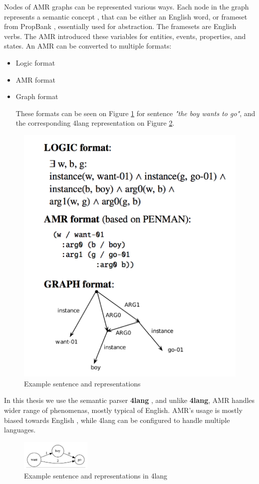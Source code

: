 Nodes of AMR graphs can be represented various ways. Each node in the graph represents a semantic concept \cite{AMR:2015}, that can be either an English word, or frameset from PropBank \cite{Palmer:2005}, essentially used for abstraction. The framesets are English verbs. The AMR introduced these variables for entities, events, properties, and states. An AMR can be converted to multiple formats:
\begin{itemize}
	\item Logic format
	\item AMR format
	\item Graph format
	
	These formats can be seen on Figure \ref{fig:amr} for sentence \textit{"the boy wants to go"}, and the corresponding 4lang representation on Figure \ref{fig:4langboy}.
	
\end{itemize}

\begin{figure}[h!]
	\centering
	\includegraphics[height=0.4\textwidth]{figures/amr}
	\caption{Example sentence and representations}
	\label{fig:amr}
\end{figure}

In this thesis we use the semantic parser \textbf{4lang} \cite{Recski:2015b}, and unlike \textbf{4lang}, AMR handles wider range of phenomenas, mostly typical of English. AMR's usage is mostly biased towards English \cite{Palmer:2005}, while 4lang can be configured to handle multiple languages.

\begin{figure}[h!]
	\centering
	\includegraphics[width=0.3\textwidth]{figures/4langboy}
	\caption{Example sentence and representations in 4lang}
	\label{fig:4langboy}
\end{figure}

